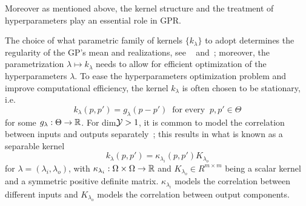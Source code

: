 Moreover as mentioned above, the kernel structure and the treatment of hyperparameters play an essential role in GPR.

The choice of what parametric family of kernels $\{ k_\lambda\}$ to adopt determines the regularity of the GP's mean and realizations, see ~\cite{Kanagawa2018} and~\cite[chap. 4]{ChristmannSteinwart2008}; moreover, the parametrization $\lambda \mapsto k_\lambda$ needs to allow for efficient optimization of the hyperparameters $\lambda$. \newline
To ease the hyperparameters optimization problem and improve computational efficiency, the kernel $k_\lambda$ is often chosen to be stationary, i.e. 
\[
k_\lambda(p, p') = g_\lambda(p - p') \ \text{ for every } \ p, p' \in \Theta
\]
for some $g_\lambda:\Theta \rightarrow \mathbb{R}$.
For dim$\mathcal Y > 1$, it is common to model the correlation between inputs and outputs separately~\cite{AlvarezRosascoLawrence2012}; this results in what is known as a separable kernel \[
    k_\lambda(p, p') = \kappa_{\lambda_i}(p, p') K_{\lambda_o}
\] for $\lambda = (\lambda_i, \lambda_o)$, with $\kappa_{\lambda_i}: \Omega \times \Omega \rightarrow \mathbb{R}$ and $K_{\lambda_o} \in R^{m\times m}$ being a scalar kernel and a symmetric positive definite matrix.
$\kappa_{\lambda_i}$ models the correlation between different inputs and $K_{\lambda_o}$ models the correlation between output components.

